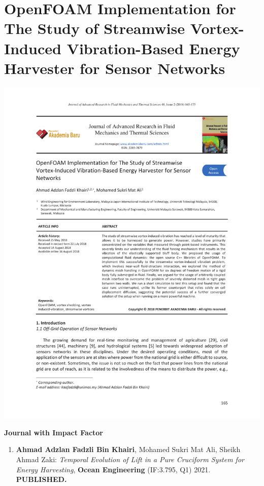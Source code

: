 \documentclass[oneside]{utmthesis}
\begin{document}
\chapter{OpenFOAM Implementation for The Study of Streamwise Vortex-Induced Vibration-Based Energy Harvester for Sensor Networks}
\begin{center}
  \includegraphics[width=1\textwidth]{figs/appendix_SCOPUS}
\end{center}

\listofpublications

\noindent \textbf{Journal with Impact Factor}
\begin{enumerate}
  \item  \textbf{Ahmad Adzlan Fadzli Bin Khairi}, Mohamed Sukri Mat Ali, Sheikh Ahmad Zaki: \textit{Temporal Evolution of Lift in a Pure Cruciform System for Energy Harvesting}, \textbf{Ocean Engineering} (IF:3.795, Q1) 2021. \textbf{PUBLISHED.}
\end{enumerate}
\end{document}
